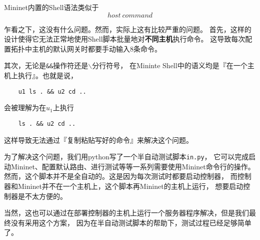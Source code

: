 Mininet内置的Shell语法类似于
$$ host\ command $$

乍看之下，这没有什么问题。然而，实际上这有比较严重的问题。
首先，这样的设计使得它无法正常地使用Shell脚本批量地对\textbf{不同主机}执行命令。
这导致每次配置拓扑中主机的默认网关时都要手动输入8条命令。

其次，无论是\texttt{\&\&}操作符还是\texttt{$\backslash$}分行符号，
在Mininte Shell中的语义均是『在一个主机上执行』。也就是说，

\begin{lstlisting}
	u1 ls . && u2 cd ..
\end{lstlisting}

会被理解为在$u_1$上执行

\begin{lstlisting}
	ls . && u2 cd ..
\end{lstlisting}

这样导致无法通过『复制粘贴写好的命令』来解决这个问题。

为了解决这个问题，我们用python写了一个半自动测试脚本\texttt{in.py}，
它可以完成启动Mininet、配置默认路由、进行测试等等一系列需要使用Mininet命令行的操作。
然而，这个脚本并不是全自动的。这是因为每次测试时都要启动控制器，
而控制器和Mininet并不在一个主机上，这个脚本再Mininet的主机上运行，
想要启动控制器是不太方便的。

当然，这也可以通过在部署控制器的主机上运行一个服务器程序解决，但是我们最终没有采用这个方案，
因为在半自动测试脚本的帮助下，测试过程已经足够简单了。

